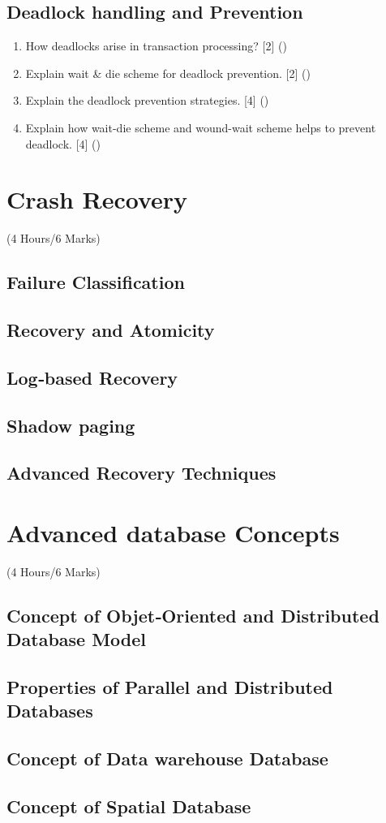 \documentclass[12pt]{article}
\begin{document}
    \subsection{Deadlock handling and Prevention}
        \begin{enumerate}[noitemsep, topsep=0pt]
            \item How deadlocks arise in transaction processing? \hfill [2] ()

            \item Explain wait \& die scheme for deadlock prevention. \hfill [2] ()

            \item Explain the deadlock prevention strategies. \hfill [4] ()
            
            \item Explain how wait-die scheme and wound-wait scheme helps to prevent deadlock. \hfill [4] ()
        \end{enumerate}

    \pagebreak
\section{Crash Recovery}
    \begin{center}(4 Hours/6 Marks)\end{center}
    \subsection{Failure Classification}
    \subsection{Recovery and Atomicity}
    \subsection{Log‐based Recovery}
    \subsection{Shadow paging}
    \subsection{Advanced Recovery Techniques}

    \pagebreak
\section{Advanced database Concepts}
    \begin{center}(4 Hours/6 Marks)\end{center}
    \subsection{Concept of Objet‐Oriented and Distributed Database Model}
    \subsection{Properties of Parallel and Distributed Databases}
    \subsection{Concept of Data warehouse Database}
    \subsection{Concept of Spatial Database}
\end{document}
